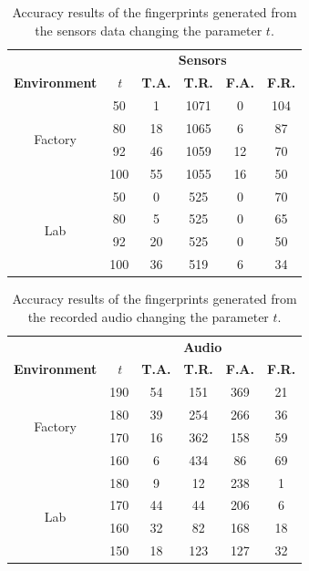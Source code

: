 \begin{table}[H]
\label{tab_sensorAcc}
\begin{center}
\begin{tabular}{|c|c|c c c c|}
\hline
&\multicolumn{5}{c|}{\textbf{Sensors}} \\\cline{2-6}
\textbf{Environment} & \textit{t} &\textbf{T.A.}& \textbf{T.R.} & \textbf{F.A.}& \textbf{F.R.} \\ \cline{1-6}
\multirow{4}{*}{Factory}
& 50 & 1 & 1071 & 0 & 104 \\ \cline{2-6}
& 80 & 18 & 1065 & 6 & 87 \\ \cline{2-6}
& 92 & 46 & 1059 & 12 & 70 \\ \cline{2-6}
& 100 & 55 & 1055 & 16 & 50 \\ \cline{1-6}
\multirow{4}{*}{Lab}
& 50 & 0 & 525 & 0 & 70 \\ \cline{2-6}
& 80 & 5 & 525 & 0 & 65 \\ \cline{2-6}
& 92 & 20 & 525 & 0 & 50 \\ \cline{2-6}
& 100 & 36 & 519 & 6 & 34 \\ \cline{1-6}
\end{tabular}
\caption{Accuracy results of the fingerprints generated from the sensors data changing the parameter $t$.  }
\end{center}
\end{table}

\begin{table}[H]
\label{tab_audioAcc}
\begin{center}
\begin{tabular}{|c|c|c c c c|}
\hline
&\multicolumn{5}{c|}{\textbf{Audio}} \\\cline{2-6}
\textbf{Environment} & \textit{t} &\textbf{T.A.}& \textbf{T.R.} & \textbf{F.A.}& \textbf{F.R.} \\ \cline{1-6}
\multirow{4}{*}{Factory}
& 190 & 54 & 151 & 369 & 21 \\ \cline{2-6}
& 180 & 39 & 254 & 266 & 36 \\ \cline{2-6}
& 170 & 16 & 362 & 158 & 59 \\ \cline{2-6}
& 160 & 6 & 434 & 86 & 69 \\ \cline{1-6}
\multirow{4}{*}{Lab}
& 180 & 9 & 12 & 238 & 1 \\ \cline{2-6}
& 170 & 44 & 44 & 206 & 6 \\ \cline{2-6}
& 160 & 32 & 82 & 168 & 18 \\ \cline{2-6}
& 150 & 18 & 123 & 127 & 32 \\ \cline{1-6}
\end{tabular}
\caption{Accuracy results of the fingerprints generated from the recorded audio changing the parameter $t$. }
\end{center}
\end{table}


